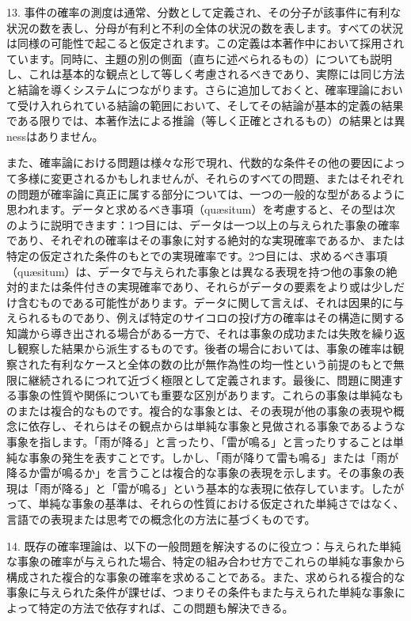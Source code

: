 \documentclass[a4paper,11pt,openany]{ltjsbook}
\begin{document}
13. 事件の確率の測度は通常、分数として定義され、その分子が該事件に有利な状況の数を表し、分母が有利と不利の全体の状況の数を表します。すべての状況は同様の可能性で起こると仮定されます。この定義は本著作中において採用されています。同時に、主題の別の側面（直ちに述べられるもの）についても説明し、これは基本的な観点として等しく考慮されるべきであり、実際には同じ方法と結論を導くシステムにつながります。さらに追加しておくと、確率理論において受け入れられている結論の範囲において、そしてその結論が基本的定義の結果である限りでは、本著作法による推論（等しく正確とされるもの）の結果とは異nessはありません。

また、確率論における問題は様々な形で現れ、代数的な条件その他の要因によって多様に変更されるかもしれませんが、それらのすべての問題、またはそれぞれの問題が確率論に真正に属する部分については、一つの一般的な型があるように思われます。データと求めるべき事項（qu\ae{}situm）を考慮すると、その型は次のように説明できます：1つ目には、データは一つ以上の与えられた事象の確率であり、それぞれの確率はその事象に対する絶対的な実現確率であるか、または特定の仮定された条件のもとでの実現確率です。2つ目には、求めるべき事項（qu\ae{}situm）は、データで与えられた事象とは異なる表現を持つ他の事象の絶対的または条件付きの実現確率であり、それらがデータの要素をより或は少しだけ含むものである可能性があります。データに関して言えば、それは因果的に与えられるものであり、例えば特定のサイコロの投げ方の確率はその構造に関する知識から導き出される場合がある一方で、それは事象の成功または失敗を繰り返し観察した結果から派生するものです。後者の場合においては、事象の確率は観察された有利なケースと全体の数の比が無作為性の均一性という前提のもとで無限に継続されるにつれて近づく極限として定義されます。最後に、問題に関連する事象の性質や関係についても重要な区別があります。これらの事象は単純なものまたは複合的なものです。複合的な事象とは、その表現が他の事象の表現や概念に依存し、それらはその観点からは単純な事象と見做される事象であるような事象を指します。「雨が降る」と言ったり、「雷が鳴る」と言ったりすることは単純な事象の発生を表すことです。しかし、「雨が降りて雷も鳴る」または「雨が降るか雷が鳴るか」を言うことは複合的な事象の表現を示します。その事象の表現は「雨が降る」と「雷が鳴る」という基本的な表現に依存しています。したがって、単純な事象の基準は、それらの性質における仮定された単純さではなく、言語での表現または思考での概念化の方法に基づくものです。

14. 既存の確率理論は、以下の一般問題を解決するのに役立つ：与えられた単純な事象の確率が与えられた場合、特定の組み合わせ方でこれらの単純な事象から構成された複合的な事象の確率を求めることである。また、求められる複合的な事象に与えられた条件が課せば、つまりその条件もまた与えられた単純な事象によって特定の方法で依存すれば、この問題も解決できる。
\end{document}
